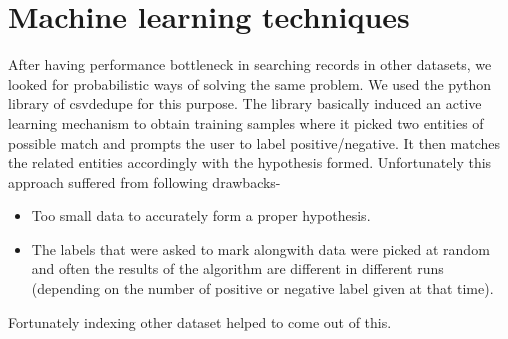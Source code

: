 \section{Machine learning techniques}

        After having performance bottleneck in searching records in other datasets, we looked for probabilistic ways of solving the same problem. We used the python library of csvdedupe for this purpose. The library basically induced an active learning mechanism to obtain training samples where it picked two entities of possible match and prompts the user to label positive/negative. It then matches the related entities accordingly with the hypothesis formed. Unfortunately this approach suffered from following drawbacks-
        \begin{itemize}
        \item Too small data to accurately form a proper hypothesis. 
        \item The labels that were asked to mark alongwith data were picked at random and often the results of the algorithm are different in different runs (depending on the number of positive or negative label given at that time).
        \end{itemize}
        Fortunately indexing other dataset helped to come out of this.

